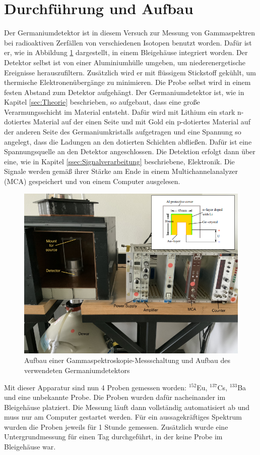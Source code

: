 \section{Durchführung und Aufbau}
\label{sec:Durchführung}
Der Germaniumdetektor ist in diesem Versuch zur Messung von Gammaspektren bei radioaktiven Zerfällen von verschiedenen Isotopen benutzt worden. 
Dafür ist er, wie in Abbildung \ref{fig:germanium} dargestellt, in einem Bleigehäuse integriert worden. Der Detektor selbst ist von einer Aluminiumhülle umgeben, um niederenergetische Ereignisse herauszufiltern.
Zusätzlich wird er mit flüssigem Stickstoff gekühlt, um thermische Elektronenübergänge zu minimieren. Die Probe selbst wird in einem festen Abstand zum Detektor aufgehängt.
Der Germaniumdetektor ist, wie in Kapitel \ref{sec:Theorie} beschrieben, so aufgebaut, dass eine große Verarmungsschicht im Material entsteht. Dafür wird mit Lithium 
ein stark n-dotiertes Material auf der einen Seite und mit Gold ein p-dotiertes Material auf der anderen Seite des Germaniumkristalls aufgetragen und eine Spannung so angelegt, dass die Ladungen an den dotierten Schichten 
abfließen. Dafür ist eine Spannungsquelle an den Detektor angeschlossen. Die Detektion erfolgt dann über eine, wie in Kapitel \ref{ssec:Signalverarbeitung} beschriebene, Elektronik. Die Signale werden gemäß ihrer Stärke 
am Ende in einem Multichannelanalyzer (MCA) gespeichert und von einem Computer ausgelesen. 
\begin{figure}[H]
    \centering
    \includegraphics[scale=0.8]{illustration/Aufbau.png}
    \caption{Aufbau einer Gammaspektroskopie-Messschaltung und Aufbau des verwendeten Germaniumdetektors \cite{V18}}
    \label{fig:germanium}
\end{figure}
\noindent Mit dieser Apparatur sind nun 4 Proben gemessen worden: $^{152}$Eu, $^{137}$Cs, $^{133}$Ba und eine unbekannte Probe.
Die Proben wurden dafür nacheinander im Bleigehäuse platziert. Die Messung läuft dann vollständig automatisiert ab und muss nur am Computer gestartet werden. 
Für ein aussagekräftiges Spektrum wurden die Proben jeweils für 1 Stunde gemessen.
Zusätzlich wurde eine Untergrundmessung für einen Tag durchgeführt, in der keine Probe im Bleigehäuse war.
